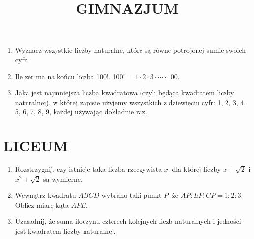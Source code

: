 \documentclass[10pt]{article}
\title{GIMNAZJUM }
\author{}
\date{}
\begin{document}
\maketitle
\begin{enumerate}
  \item Wyznacz wszystkie liczby naturalne, które są równe potrojonej sumie swoich cyfr.
  \item Ile zer ma na końcu liczba 100!. 100! = \(1 \cdot 2 \cdot 3 \cdot \cdots \cdot 100\).
  \item Jaka jest najmniejsza liczba kwadratowa (czyli będąca kwadratem liczby naturalnej), w której zapisie użyjemy wszystkich z dziewięciu cyfr: 1, 2, 3, 4, 5, 6, 7, 8, 9, każdej używając dokładnie raz.
\end{enumerate}

\section*{LICEUM}
\begin{enumerate}
  \item Rozstrzygnij, czy istnieje taka liczba rzeczywista \(x\), dla której liczby \(x+\sqrt{2}\) i \(x^{2}+\sqrt{2}\) są wymierne.
  \item Wewnątrz kwadratu \(A B C D\) wybrano taki punkt \(P\), że \(A P: B P: C P=1: 2: 3\). Oblicz miarę kąta \(A P B\).
  \item Uzasadnij, że suma iloczynu czterech kolejnych liczb naturalnych i jedności jest kwadratem liczby naturalnej.
\end{enumerate}
\end{document}
